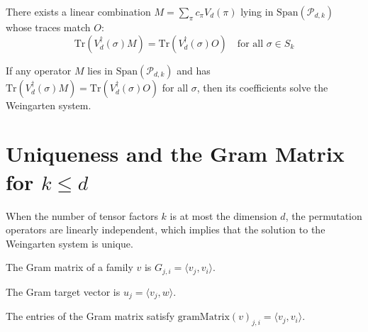 \begin{theorem}\label{thm:weingarten_moment_operator_spec}
  \leanok
  There exists a linear combination $M = \sum_{\pi} c_\pi V_d(\pi)$ lying in $\text{Span}(\mathcal{P}_{d,k})$ whose traces match $O$:
  \begin{equation}
    \text{Tr}(V_d^\dagger(\sigma) M) = \text{Tr}(V_d^\dagger(\sigma) O) \quad \text{for all } \sigma \in S_k
  \end{equation}
\end{theorem}

\begin{theorem}\label{thm:weingarten_moment_decomposition_of_props}
  \leanok
  If any operator $M$ lies in $\text{Span}(\mathcal{P}_{d,k})$ and has $\text{Tr}(V_d^\dagger(\sigma) M) = \text{Tr}(V_d^\dagger(\sigma) O)$ for all $\sigma$, then its coefficients solve the Weingarten system.
\end{theorem}


\section{Uniqueness and the Gram Matrix for $k \le d$}

When the number of tensor factors $k$ is at most the dimension $d$, the permutation operators are linearly independent, which implies that the solution to the Weingarten system is unique.

\begin{definition}\label{def:gramMatrix}
  \leanok
  The Gram matrix of a family $v$ is $G_{j, i} = \langle v_j, v_i \rangle$.
\end{definition}

\begin{definition}\label{def:gramVec}
  \leanok
  The Gram target vector is $u_j = \langle v_j, w \rangle$.
\end{definition}

\begin{theorem}\label{thm:gramMatrix_apply}
  \leanok
  The entries of the Gram matrix satisfy $\text{gramMatrix}(v)_{j, i} = \langle v_j, v_i \rangle$.
\end{theorem}

